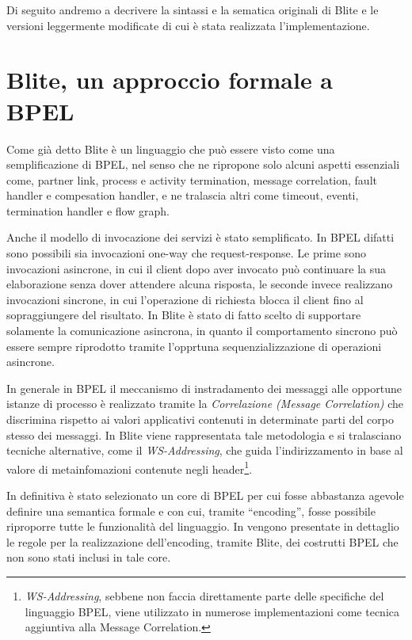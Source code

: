 Di seguito andremo a decrivere la sintassi e  la sematica originali di Blite e
le versioni leggermente modificate di cui è stata realizzata l'implementazione.

\section{Blite, un approccio formale a BPEL}
\label{sec:blite}
Come già detto Blite è un linguaggio che può essere visto come una
semplificazione di BPEL, nel senso che ne ripropone solo alcuni aspetti
essenziali come, partner link, process e activity termination, message
correlation, fault handler e compesation handler, e ne tralascia altri come
timeout, eventi, termination handler e flow graph.

Anche il modello di invocazione dei servizi è stato semplificato. In BPEL difatti
sono possibili sia invocazioni one-way che request-response. Le prime sono
invocazioni asincrone, in cui il client dopo aver invocato può continuare la sua
elaborazione senza dover attendere alcuna risposta, le seconde invece realizzano
invocazioni sincrone, in cui l'operazione di richiesta blocca il client fino al
sopraggiungere del risultato. In Blite è stato di fatto scelto di supportare
solamente la comunicazione asincrona, in quanto il comportamento sincrono può
essere sempre riprodotto tramite l'opprtuna sequenzializzazione di operazioni
asincrone.

In generale in BPEL il meccanismo di instradamento dei messaggi alle opportune
istanze di processo è realizzato tramite la \emph{Correlazione (Message
Correlation)} che discrimina rispetto ai valori applicativi contenuti in determinate parti del
corpo stesso dei messaggi. In Blite viene rappresentata tale metodologia e si
tralasciano tecniche alternative, come il \emph{WS-Addressing}, che guida
l'indirizzamento in base al valore di metainfomazioni contenute negli
header\footnote{\emph{WS-Addressing}, sebbene non faccia direttamente parte
delle specifiche del linguaggio BPEL, viene utilizzato in numerose
implementazioni come tecnica aggiuntiva alla Message
Correlation.}.

In definitiva è stato selezionato un core di BPEL per cui fosse abbastanza
agevole definire una semantica formale e con cui, tramite ``encoding'', fosse
possibile riproporre tutte le funzionalità del linguaggio. In \cite{LaPuTie1}
vengono presentate in dettaglio le regole per la realizzazione dell'encoding,
tramite Blite, dei costrutti BPEL che non sono stati inclusi in tale core. 

